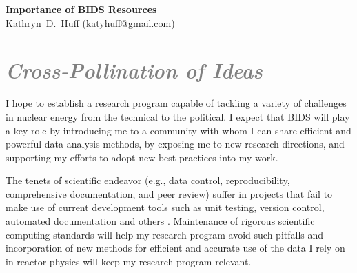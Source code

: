 \documentclass[a4paper, 10pt]{article}
\makeatletter
\newcommand{\authorname}{Kathryn~D.~Huff }
\newcommand{\authoremail}{katyhuff@gmail.com}
\newcommand{\authorsite}{katyhuff.github.com}
\makeatother
\begin{document}
\pagestyle{fancy}
\lhead{\textcolor{gray}{\it \authorname}}
\rhead{\textcolor{gray}{\thepage/\totalpages{}}}
\renewcommand{\headrulewidth}{0pt} 
\renewcommand{\footrulewidth}{0pt} 
\fancyfoot[C]{\footnotesize \textcolor{gray}{\authorsite}} 

\begin{center}
{\LARGE \bf Importance of BIDS Resources}\\
\vspace*{0.1cm}
{\normalsize \authorname (\authoremail)}
\end{center}




\section*{\textcolor{gray}{\it Cross-Pollination of Ideas}}
I hope to establish a research program capable of tackling a 
variety of challenges in nuclear energy from the technical to the political.  
I expect that BIDS will play a key role by introducing me to a 
community with whom I can share efficient and powerful 
data analysis methods, by exposing me to new research directions, and 
supporting my efforts to adopt new best practices into my work.

The tenets of scientific endeavor (e.g., data control, reproducibility, 
comprehensive documentation, and peer review) suffer in projects that fail to 
make use of current development tools such as unit testing, version control, 
automated documentation and others \cite{wilson_best_2014, 
merali_computational_2010}.  Maintenance of rigorous scientific computing 
standards will help my research program avoid such pitfalls 
\cite{huff_rapid_2011} and incorporation of new methods for efficient and 
accurate use of the data I rely on in reactor physics will keep my research 
program relevant.
\end{document}
